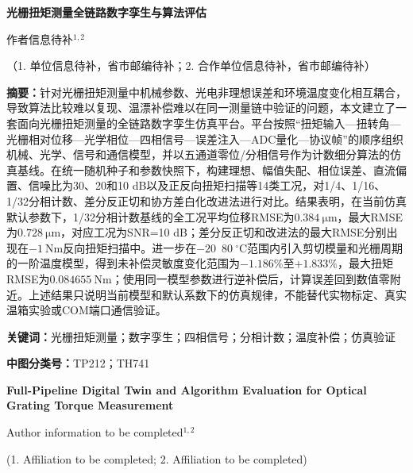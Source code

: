 \documentclass[UTF8,a4paper,12pt]{ctexart}
\newcommand{\zhabstract}[1]{\noindent\textbf{摘\quad 要：}#1\par}
\newcommand{\zhkeywords}[1]{\noindent\textbf{关键词：}#1\par}
\newcommand{\clc}[1]{\noindent\textbf{中图分类号：}#1\par}
\begin{document}
\begin{center}
{\heiti{}\textbf{光栅扭矩测量全链路数字孪生与算法评估}\par}
\vspace{0.8em}
{ 作者信息待补$^{1,2}$\par}
\vspace{0.5em}
{（1. 单位信息待补，省市邮编待补；2. 合作单位信息待补，省市邮编待补）\par}
\end{center}

\vspace{0.8em}

\zhabstract{针对光栅扭矩测量中机械参数、光电非理想误差和环境温度变化相互耦合，导致算法比较难以复现、温漂补偿难以在同一测量链中验证的问题，本文建立了一套面向光栅扭矩测量的全链路数字孪生仿真平台。平台按照“扭矩输入—扭转角—光栅相对位移—光学相位—四相信号—误差注入—ADC量化—协议帧”的顺序组织机械、光学、信号和通信模型，并以五通道零位/分相信号作为计数细分算法的仿真基线。在统一随机种子和参数快照下，构建理想、幅值失配、相位误差、直流偏置、信噪比为30、20和10 dB以及正反向扭矩扫描等14类工况，对1/4、1/16、1/32分相计数、差分反正切和协方差白化改进法进行对比。结果表明，在当前仿真默认参数下，1/32分相计数基线的全工况平均位移RMSE为$0.384~\si{\micro\metre}$，最大RMSE为$0.728~\si{\micro\metre}$，对应工况为SNR=10 dB；差分反正切和改进法的最大RMSE分别出现在$-1~\si{\newton\metre}$反向扭矩扫描中。进一步在$-20$~$80~^\circ\mathrm{C}$范围内引入剪切模量和光栅周期的一阶温度模型，得到未补偿灵敏度变化范围为$-1.186\%$至$+1.833\%$，最大扭矩RMSE为$0.084655~\si{\newton\metre}$；使用同一模型参数进行逆补偿后，计算误差回到数值零附近。上述结果只说明当前模型和默认系数下的仿真规律，不能替代实物标定、真实温箱实验或COM端口通信验证。}

\vspace{0.4em}
\zhkeywords{光栅扭矩测量；数字孪生；四相信号；分相计数；温度补偿；仿真验证}
\clc{TP212；TH741}

\vspace{1em}
\begin{center}
{\bfseries\large Full-Pipeline Digital Twin and Algorithm Evaluation for Optical Grating Torque Measurement\par}
\vspace{0.6em}
Author information to be completed$^{1,2}$\par
\vspace{0.4em}
\small
(1. Affiliation to be completed; 2. Affiliation to be completed)\par
\end{center}
\end{document}
